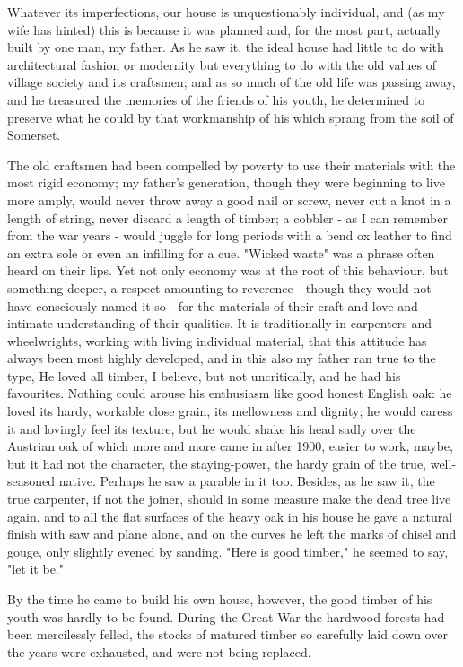 
Whatever its imperfections, our house is unquestionably individual, and (as my wife has hinted) this is because it was planned and, for the most part, actually built by one man, my father. As he saw it, the ideal house had little to do with architectural fashion or modernity but everything to do with the old values of village society and its craftsmen; and as so much of the old life was passing away, and he treasured the memories of the friends of his youth, he determined to preserve what he could by that workmanship of his which sprang from the soil of Somerset.

The old craftsmen had been compelled by poverty to use their materials with the most rigid economy; my father's generation, though they were beginning to live more amply, would never throw away a good nail or screw, never cut a knot in a length of string, never discard a length of timber; a cobbler - as I can remember from the war years - would juggle for long periods with a bend ox leather to find an extra sole or even an infilling for a cue. "Wicked waste" was a phrase often heard on their lips. Yet not only economy was at the root of this behaviour, but something deeper, a respect amounting to reverence - though they would not have consciously named it so - for the materials of their craft and love and intimate understanding of their qualities. It is traditionally in carpenters and wheelwrights, working with living individual material, that this attitude has always been most highly developed, and in this also my father ran true to the type, He loved all timber, I believe, but not uncritically, and he had his favourites. Nothing could arouse his enthusiasm like good honest English oak: he loved its hardy, workable close grain, its mellowness and dignity; he would caress it and lovingly feel its texture, but he would shake his head sadly over the Austrian oak of which more and more came in after 1900, easier to work, maybe, but it had not the character, the staying-power, the hardy grain of the true, well-seasoned native. Perhaps he saw a parable in it too. Besides, as he saw it, the true carpenter, if not the joiner, should in some measure make the dead tree live again, and to all the flat surfaces of the heavy oak in his house he gave a natural finish with saw and plane alone, and on the curves he left the marks of chisel and gouge, only slightly evened by sanding. "Here is good timber," he seemed to say, "let it be."

By the time he came to build his own house, however, the good timber of his youth was hardly to be found. During the Great War the hardwood forests had been mercilessly felled, the stocks of matured timber so carefully laid down over the years were exhausted, and were not being replaced.

